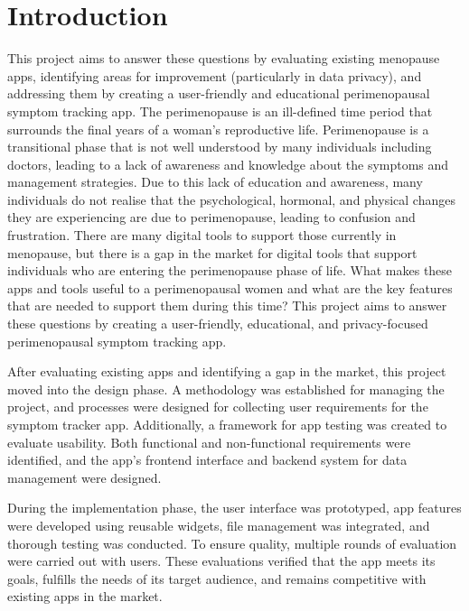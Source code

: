 \section{Introduction}

This project aims to answer these questions by evaluating existing menopause apps, identifying areas for improvement (particularly in data privacy), and addressing them by creating a user-friendly and educational perimenopausal symptom tracking app. The perimenopause is an ill-defined time period that surrounds the final years of a woman's reproductive life\cite{Santoro2016}. Perimenopause is a transitional phase that is not well understood by many individuals including doctors, leading to a lack of awareness and knowledge about the symptoms and management strategies. Due to this lack of education and awareness, many individuals do not realise that the psychological, hormonal, and physical changes they are experiencing are due to perimenopause, leading to confusion and frustration\cite{Muir2022}. There are many digital tools to support those currently in menopause, but there is a gap in the market for digital tools that support individuals who are entering the perimenopause phase of life. What makes these apps and tools useful to a perimenopausal women and what are the key features that are needed to support them during this time? This project aims to answer these questions by creating a user-friendly, educational, and privacy-focused perimenopausal symptom tracking app.

After evaluating existing apps and identifying a gap in the market, this project moved into the design phase. A methodology was established for managing the project, and processes were designed for collecting user requirements for the symptom tracker app. Additionally, a framework for app testing was created to evaluate usability. Both functional and non-functional requirements were identified, and the app’s frontend interface and backend system for data management were designed.  

During the implementation phase, the user interface was prototyped, app features were developed using reusable widgets, file management was integrated, and thorough testing was conducted. To ensure quality, multiple rounds of evaluation were carried out with users. These evaluations verified that the app meets its goals, fulfills the needs of its target audience, and remains competitive with existing apps in the market.